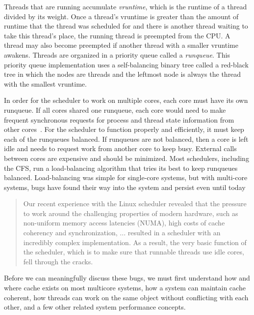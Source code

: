 \documentclass{sig-alternate}
\begin{document}
Threads that are running accumulate \emph{vruntime}, which is the runtime of a thread divided by its weight. Once a thread's vruntime is greater than the amount of runtime that the thread was scheduled for and there is another thread waiting to take this thread's place, the running thread is preempted from the CPU. A thread may also become preempted if another thread with a smaller vruntime awakens. Threads are organized in a priority queue called a \emph{runqueue}. This priority queue implementation uses a self-balancing binary tree called a red-black tree in which the nodes are threads and the leftmost node is always the thread with the smallest vruntime.~\cite{Lozi:2016}

In order for the scheduler to work on multiple cores, each core must have its own runqueue. If all cores shared one runqueue, each core would need to make frequent synchronous requests for process and thread state information from other cores~\cite{Lozi:2016}. For the scheduler to function properly and efficiently, it must keep each of the runqueues balanced. If runqueues are not balanced, then a core is left idle and needs to request work from another core to keep busy. External calls between cores are expensive and should be minimized. Most schedulers, including the CFS, run a load-balancing algorithm that tries its best to keep runqueues balanced. Load-balancing was simple for single-core systems, but with multi-core systems, bugs have found their way into the system and persist even until today

\begin{quote}
Our recent experience with the Linux scheduler revealed that the pressure to work around the challenging properties of modern hardware, such as non-uniform memory access latencies (NUMA), high costs of cache coherency and synchronization, ... resulted in a scheduler with an incredibly complex implementation. As a result, the very basic function of the scheduler, which is to make sure that runnable threads use idle cores, fell through the cracks.~\cite{Lozi:2016}
\end{quote}

Before we can meaningfully discuss these bugs, we must first understand how and where cache exists on most multicore systems, how a system can maintain cache coherent, how threads can work on the same object without conflicting with each other, and a few other related system performance concepts.

\end{document}

